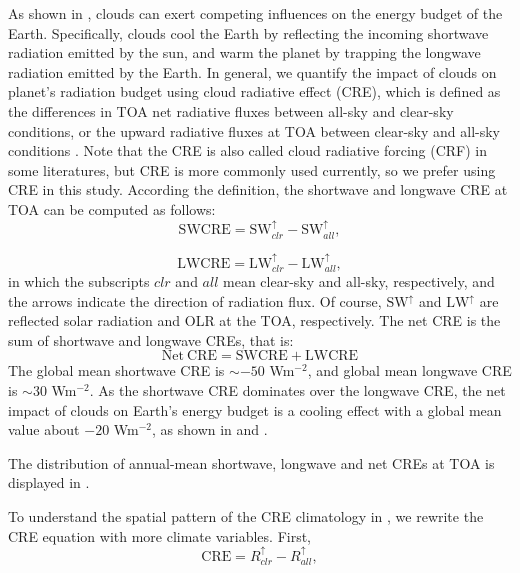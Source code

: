 As shown in , clouds can exert competing influences on the energy budget of the Earth. Specifically, clouds cool the Earth by reflecting the incoming shortwave radiation emitted by the sun, and warm the planet by trapping the longwave radiation emitted by the Earth. In general, we quantify the impact of clouds on planet's radiation budget using cloud radiative effect (CRE), which is defined as the differences in TOA net radiative fluxes between all-sky and clear-sky conditions, or the upward radiative fluxes at TOA between clear-sky and all-sky conditions \citep[e.g.,][]{Ramanathan1989,Soden2004,Soden2008,Li2017}. Note that the CRE is also called cloud radiative forcing (CRF) in some literatures, but CRE is more commonly used currently, so we prefer using CRE in this study. According the definition, the shortwave and longwave CRE at TOA can be computed as follows:
\begin{equation}
    \mathrm{SWCRE} = \mathrm{SW}_{clr}^{\uparrow} - \mathrm{SW}_{all}^{\uparrow},
    \label{eq:swcre}
\end{equation}

\begin{equation}
    \mathrm{LWCRE} = \mathrm{LW}_{clr}^{\uparrow} - \mathrm{LW}_{all}^{\uparrow},
    \label{eq:lwcre}
\end{equation}
in which the subscripts $clr$ and $all$ mean clear-sky and all-sky, respectively, and the arrows indicate the direction of radiation flux. Of course, $\mathrm{SW}^{\uparrow}$ and $\mathrm{LW}^{\uparrow}$ are reflected solar radiation and OLR at the TOA, respectively. The net CRE is the sum of shortwave and longwave CREs, that is:
\begin{equation}
    \mathrm{Net~CRE} = \mathrm{SWCRE} + \mathrm{LWCRE}
    \label{eq:net_cre}
\end{equation}
The global mean shortwave CRE is $\sim-50$ Wm$^{-2}$, and global mean longwave CRE is $\sim30$ Wm$^{-2}$. As the shortwave CRE dominates over the longwave CRE, the net impact of clouds on Earth's energy budget is a cooling effect with a global mean value about $-20$ Wm$^{-2}$, as shown in  and .

The distribution of annual-mean shortwave, longwave and net CREs at TOA is displayed in .

To understand the spatial pattern of the CRE climatology in , we rewrite the CRE equation with more climate variables. First,
\begin{equation}
    \mathrm{CRE} = R_{clr}^{\uparrow} - R_{all}^{\uparrow},
\end{equation}


